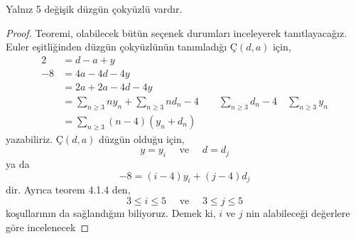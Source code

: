 \documentclass[11pt]{amsbook}
\begin{document}
\begin{theorem}
    Yalnız 5 değişik düzgün çokyüzlü vardır.
\end{theorem}
\begin{proof}
    Teoremi, olabilecek bütün seçenek durumları inceleyerek tanıtlayacağız. Euler eşitliğinden düzgün çokyüzlünün tanımladığı $ Ç(d, a) $ için,
    \begin{align*} 
         2 &= d - a + y \\ 
        -8 &= 4a - 4d - 4y \\
           &= 2a + 2a - 4d - 4y \\
           &= \sum_{n \geq 3} n y_{n} + \sum_{n \geq 3} n d_{n} - 4 \quad \quad \sum_{n \geq 3} d_{n} - 4 \quad \sum_{n \geq 3} y_{n} \\
           &= \sum_{n \geq 3} (n-4) (y_{n} + d_{n})
    \end{align*}
    yazabiliriz. $ Ç(d,a)$ düzgün olduğu için,
    \[
        y = y_{i} \quad \text{ ve } \quad d = d_{j}
    \]
    ya da
    \[
        -8 = (i-4)y_{i} + (j-4)d_{j}
    \]
    dir. Ayrıca teorem 4.1.4 den,
    \[
        3 \leq i \leq 5 \quad \text{ ve } \quad  3 \leq j \leq 5
    \]
    koşullarının da sağlandığını biliyoruz. Demek ki, $i$ ve $j$ nin alabileceği değerlere göre incelenecek
\end{proof}
\end{document}
